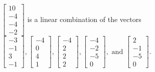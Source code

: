\begin{exercise}
\begin{exerciseStatement}
  \end{exerciseStatement}
  \begin{exerciseAnswer}
   \(\left[\begin{array}{c}
10 \\
-4 \\
-4 \\
-2
\end{array}\right]\) 
  	 is  
	a linear combination of the vectors \(\left[\begin{array}{c}
-3 \\
-1 \\
3 \\
-1
\end{array}\right] , \left[\begin{array}{c}
-4 \\
0 \\
4 \\
1
\end{array}\right] , \left[\begin{array}{c}
-4 \\
2 \\
2 \\
2
\end{array}\right] , \left[\begin{array}{c}
-4 \\
-2 \\
-5 \\
0
\end{array}\right] , \text{ and } \left[\begin{array}{c}
2 \\
-1 \\
-5 \\
0
\end{array}\right]\).

	
  


  \end{exerciseAnswer}
\end{exercise}